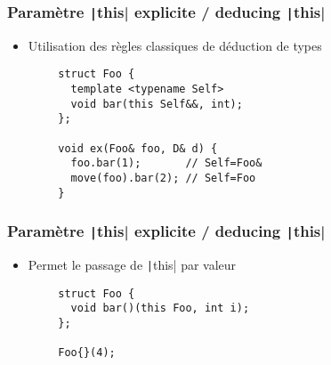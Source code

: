 \documentclass[C++.tex]{subfiles}
\begin{document}
\begin{frame}[fragile]
	\frametitle{Paramètre \texttt|this| explicite / deducing \texttt|this|}
	\begin{itemize}
		\item Utilisation des règles classiques de déduction de types
	\end{itemize}

	\begin{verbatim}
		struct Foo {
		  template <typename Self>
		  void bar(this Self&&, int);
		};

		void ex(Foo& foo, D& d) {
		  foo.bar(1);       // Self=Foo&
		  move(foo).bar(2); // Self=Foo
		}
	\end{verbatim}

\end{frame}

\begin{frame}[fragile]
	\frametitle{Paramètre \texttt|this| explicite / deducing \texttt|this|}
	\begin{itemize}
		\item Permet le passage de \texttt|this| par valeur
	\end{itemize}

	\begin{verbatim}
		struct Foo {
		  void bar()(this Foo, int i);
		};

		Foo{}(4);
	\end{verbatim}

\end{frame}
\end{document}
